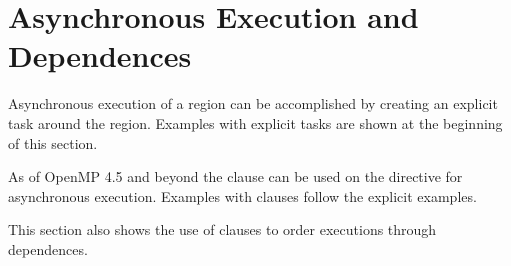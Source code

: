 \pagebreak
\section{Asynchronous  Execution and Dependences}
\label{sec:async_target_exec_depend}

Asynchronous execution of a  region can be accomplished
by creating an explicit task around the  region. Examples
with explicit tasks are shown at the beginning of this section. 

As of OpenMP 4.5 and beyond the  clause can be used on the
 directive for asynchronous execution. Examples with 
 clauses follow the explicit  examples.

This section also shows the use of  clauses to order 
executions through dependences.
